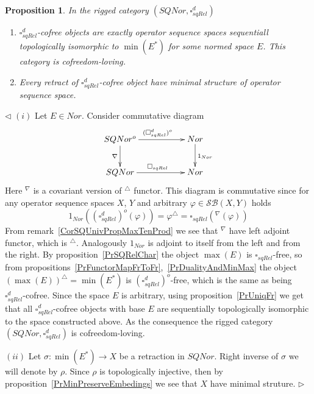 \documentclass[12pt]{article}
\newtheorem{proposition}[theorem]{Proposition}
\newenvironment{proof}{\par $\triangleleft$}{$\triangleright$}
\begin{document}
\begin{proposition}\label{PrSQReldChar}
In the rigged category $(SQNor,\square_{sqRel}^d)$
\begin{enumerate}[label = (\roman*)]
    \item $\square_{sqRel}^d$-cofree objects are exactly operator 
    sequence spaces  sequentiall topologically isomorphic to $\min(E^*)$ 
    for some normed space $E$. This category is cofreedom-loving. 

    \item Every retract of $\square_{sqRel}^d$-cofree object have minimal 
    structure of operator sequence space.
\end{enumerate}
\end{proposition}
\begin{proof}
$(i)$ Let $E\in Nor$. Consider commutative diagram
$$
\xymatrix{SQNor^o 
\ar[d]_{\nabla } \ar[rr]^{(\square_{sqRel}^{d})^o} & &  %
{Nor}\ar[d]^{1_{Nor}} \\  %
SQNor\ar[rr]^{\square_{sqRel}}&  &{Nor}}  %
$$
Here ${}^\nabla$ is a covariant version of ${}^\triangle$ functor.
This diagram is commutative since for any operator sequence spaces $X$, $Y$ 
and arbitrary $\varphi\in\mathcal{SB}(X,Y)$ holds
$$
1_{Nor}({(\square_{sqRel}^d)}^o(\varphi)) =\varphi^\triangle
=\square_{sqRel}({}^\nabla(\varphi))
$$
From remark~\ref{CorSQUnivPropMaxTenProd} we see that ${}^\nabla$ have 
left adjoint functor, which is ${}^\triangle$. Analogously $1_{Nor}$ is adjoint 
to itself from the left and from the right. By proposition~\ref{PrSQRelChar} 
the object $\max(E)$ is $\square_{sqRel}$-free, so 
from propositions~\ref{PrFunctorMapFrToFr},~\ref{PrDualityAndMinMax} the object 
${(\max(E))}^\triangle=\min(E^*)$ is ${(\square_{sqRel}^d)}^o$-free, which is 
the same as being $\square_{sqRel}^d$-cofree. 
Since the space $E$ is arbitrary, using proposition~\ref{PrUniqFr} we get 
that all $\square_{sqRel}^d$-cofree objects with base $E$ are sequentially 
topologically isomorphic to the space constructed above. As the consequence 
the rigged category $(SQNor,\square_{sqRel}^d)$ is cofreedom-loving.

$(ii)$ Let $\sigma:\min(E^*)\to X$ be a retraction in $SQNor$. Right inverse of 
$\sigma$ we will denote by $\rho$. Since $\rho$ is topologically injective, 
then by proposition~\ref{PrMinPreserveEmbedings} we see that $X$ 
have minimal struture.
\end{proof}
\end{document}
